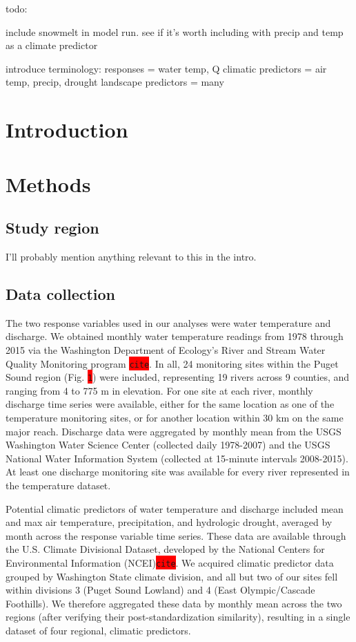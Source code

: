 \documentclass{article}
\begin{document}
todo:

include snowmelt in model run. see if it's worth including with precip and temp as a climate predictor

introduce terminology:
responses = water temp, Q
climatic predictors = air temp, precip, drought
landscape predictors = many

\section*{Introduction}


\section*{Methods}
\subsection*{Study region}
I'll probably mention anything relevant to this in the intro.

\subsection*{Data collection}
The two response variables used in our analyses were water temperature and discharge. We obtained monthly water temperature readings from 1978 through 2015 via the Washington Department of Ecology's River and Stream Water Quality Monitoring program \colorbox{red}{\lstinline{cite}}. In all, 24 monitoring sites within the Puget Sound region (Fig. \colorbox{red}{\lstinline{1}}) were included, representing 19 rivers across 9 counties, and ranging from 4 to 775 m in elevation. For one site at each river, monthly discharge time series were available, either for the same location as one of the temperature monitoring sites, or for another location within 30 km on the same major reach. Discharge data were aggregated by monthly mean from the USGS Washington Water Science Center (collected daily 1978-2007) and the USGS National Water Information System (collected at 15-minute intervals 2008-2015). At least one discharge monitoring site was available for every river represented in the temperature dataset.

Potential climatic predictors of water temperature and discharge included mean and max air temperature, precipitation, and hydrologic drought, averaged by month across the response variable time series. These data are available through the U.S. Climate Divisional Dataset, developed by the National Centers for Environmental Information (NCEI)\colorbox{red}{\lstinline{cite}}. We acquired climatic predictor data grouped by Washington State climate division, and all but two of our sites fell within divisions 3 (Puget Sound Lowland) and 4 (East Olympic/Cascade Foothills). We therefore aggregated these data by monthly mean across the two regions (after verifying their post-standardization similarity), resulting in a single dataset of four regional, climatic predictors.
\end{document}
